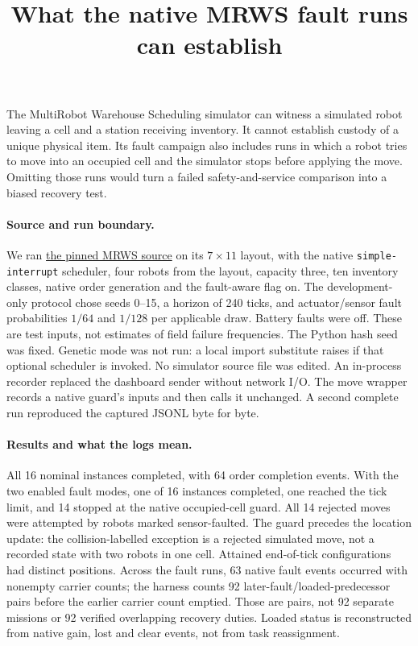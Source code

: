 \documentclass[11pt]{article}
\title{What the native MRWS fault runs can establish}
\date{}
\begin{document}
\maketitle

The MultiRobot Warehouse Scheduling simulator can witness a simulated
robot leaving a cell and a station receiving inventory. It cannot
establish custody of a unique physical item. Its fault campaign also
includes runs in which a robot tries to move into an occupied cell
and the simulator stops before applying the move. Omitting those
runs would turn a failed safety-and-service comparison into a biased
recovery test.

\paragraph{Source and run boundary.}
We ran \href{https://github.com/automaticdai/MRWS_MultiRobot_Warehouse_Scheduling/tree/941338e9ea4c4eaebb87f8374f80fd576497ad01}
{the pinned MRWS source} on its \(7\times11\) layout, with the native
\texttt{simple-interrupt} scheduler, four robots from the layout,
capacity three, ten inventory classes, native order generation and
the fault-aware flag on. The development-only protocol chose seeds
0--15, a horizon of 240 ticks, and actuator/sensor fault probabilities
\(1/64\) and \(1/128\) per applicable draw. Battery faults were off.
These are test inputs, not estimates of field failure frequencies.
The Python hash seed was fixed. Genetic mode was not run: a local
import substitute raises if that optional scheduler is invoked.
No simulator source file was edited. An in-process recorder replaced
the dashboard sender without network I/O. The move wrapper records a
native guard's inputs and then calls it unchanged. A second complete
run reproduced the captured JSONL byte for byte.

\paragraph{Results and what the logs mean.}
All 16 nominal instances completed, with 64 order completion
events. With the two enabled fault modes, one of 16 instances
completed, one reached the tick limit, and 14 stopped at the
native occupied-cell guard. All 14 rejected moves were attempted
by robots marked sensor-faulted. The guard precedes the location
update: the collision-labelled exception is a rejected simulated
move, not a recorded state with two robots in one cell. Attained
end-of-tick configurations had distinct positions. Across the
fault runs, 63 native fault events occurred with nonempty carrier
counts; the harness counts 92 later-fault/loaded-predecessor pairs
before the earlier carrier count emptied. Those are pairs, not
92 separate missions or 92 verified overlapping recovery duties.
Loaded status is reconstructed from native gain, lost and clear
events, not from task reassignment.
\end{document}
